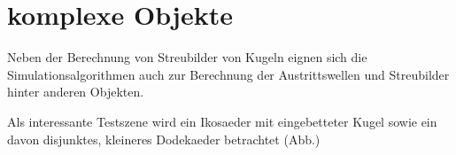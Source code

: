 \section{komplexe Objekte}
Neben der Berechnung von Streubilder von Kugeln eignen sich die Simulationsalgorithmen auch zur Berechnung der Austrittswellen und Streubilder hinter anderen Objekten.

Als interessante Testszene wird ein Ikosaeder mit eingebetteter Kugel sowie ein davon disjunktes, kleineres Dodekaeder betrachtet (Abb.)


